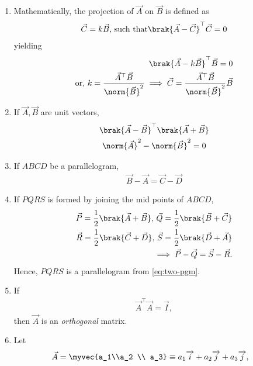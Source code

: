 \begin{enumerate}[label=\thesubsubsection.\arabic*.,ref=\thesubsubsection.\theenumi]
	\item Mathematically, 
the projection of $\vec{A}$ on $\vec{B}$ is defined as
		\begin{align}
	\vec{C} = k \vec{B},\, \text{such that}
	\brak{\vec{A}-\vec{C}}^{\top}\vec{C} = 0
\end{align}
yielding
\begin{align}
	\brak{\vec{A}-k\vec{B}}^{\top}\vec{B} = 0
	\\
	\text{or, } k = 
	\frac{\vec{A}^{\top}\vec{B}}{\norm{\vec{B}}^2}
	\implies 
	\vec{C} = 
	\frac{\vec{A}^{\top}\vec{B}}{\norm{\vec{B}}^2}
 \vec{B}
	\label{eq:12/10/3/4/proj}
\end{align}
\item If $\vec{A}, \vec{B}$ are unit vectors, 
\begin{multline}
	\brak{\vec{A}-\vec{B}}^{\top} 
	\brak{\vec{A}+\vec{B}} 
	\\
\norm{\vec{A}}^2 - \norm{\vec{B}}^2
	= 0
	\label{eq:12/10/3/11/unit}
\end{multline}
  \item If $ABCD$ be a parallelogram,
	  \label{prop:two-pgm}
  \begin{align}
	  \label{eq:two-pgm}
 \vec{B}-\vec{A} = \vec{C} -\vec{D}
  \end{align}
  \item 
If $PQRS$ is formed by joining the mid points of $ABCD$, 
\begin{align}
  \vec{P} = \frac{1}{2}\brak{\vec{A}+\vec{B}} 
  ,\,
 \vec{Q} = \frac{1}{2}\brak{\vec{B}+\vec{C}} 
 \\
 \vec{R} = \frac{1}{2}\brak{\vec{C}+\vec{D}}   
  ,\,
 \vec{S} = \frac{1}{2}\brak{\vec{D}+\vec{A}}  
 \\
	\implies 
 \vec{P}-\vec{Q} = \vec{S} -\vec{R}.
  \label{eq:10/7/4/8det2f}
\end{align}
Hence, $PQRS$ is a parallelogram
	  from \eqref{eq:two-pgm}.
  \item If 
\begin{align}
	\vec{A}^{\top}\vec{A} =\vec{I},
\label{eq:12/10/3/5/inner}
\end{align}
		then $	\vec{A}$ is an {\em orthogonal} matrix.
\item Let 
\begin{align}
  \vec{A} &= \myvec{a_1\\a_2 \\ a_3} \equiv a_1\overrightarrow{i}+a_2\overrightarrow{j}+a_3\overrightarrow{j}, 

\end{align}
\end{enumerate}
